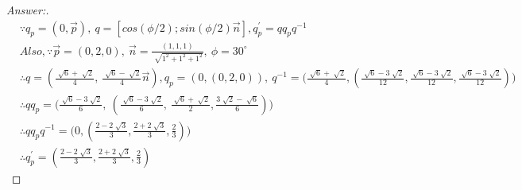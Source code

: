 \documentclass[12pt]{article}
\begin{document}
\begin{proof}[Answer:]
\begin{align*}
&\because q_p = (0, \vec{p}),\  q = [cos(\phi / 2); sin(\phi /2)\vec{n}], q^{'}_p = qq_pq^{-1}\\
&Also, \because  \vec{p} = (0, 2, 0), \ \vec{n}= \frac {(1, 1, 1)} { \sqrt[]{1^2 + 1^2 + 1^2}},  \ \phi = 30^\circ \\
&\therefore q = (\frac{\sqrt[]{6} + \sqrt[]{2}}{4},\  \frac{\sqrt[]{6} - \sqrt[]{2}}{4}\vec{n}) ,  q_p = (0, (0, 2, 0)), \ q^{-1} = \big(\frac{\sqrt[]{6} + \sqrt[]{2}}{4}, 
(\frac{\sqrt[]{6} - 3\sqrt[]{2}}{12}, \frac{\sqrt[]{6} - 3\sqrt[]{2}}{12}, \frac{\sqrt[]{6} - 3\sqrt[]{2}}{12})\big)\\
&\therefore qq_p=\big(\frac{\sqrt[]{6} - 3\sqrt[]{2}}{6}, \ (\frac{\sqrt[]{6} - 3\sqrt[]{2}}{6}, \ \frac{\sqrt[]{6} + \sqrt[]{2}}{2}  , \frac{3\sqrt[]{2} - \sqrt[]{6}}{6})\big)\\
&\therefore qq_pq^{-1} = \big(0, (\frac{2 - 2\sqrt[]{3}}{3}, \frac{2 + 2\sqrt[]{3}}{3}, \frac{2}{3})\big)\\
&\therefore q^{'}_p = (\frac{2 - 2\sqrt[]{3}}{3}, \frac{2 + 2\sqrt[]{3}}{3}, \frac{2}{3})
\end{align*}
\end{proof}
 
\end{document}
